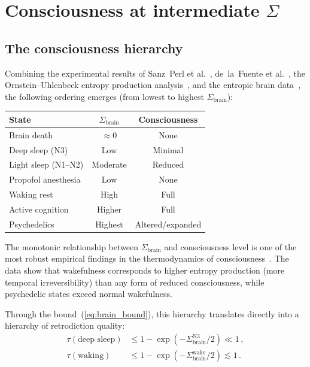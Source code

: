 \documentclass[prl,twocolumn,superscriptaddress,longbibliography,floatfix]{revtex4-2}
\newcommand{\tauasym}{\tau}
\newcommand{\Sbrain}{\Sigma_{\mathrm{brain}}}
\begin{document}
\section{Consciousness at intermediate $\Sigma$}
\label{sec:intermediate}

\subsection{The consciousness hierarchy}
\label{subsec:hierarchy}

Combining the experimental results of Sanz~Perl et
al.~\cite{SanzPerl2021}, de~la~Fuente et al.~\cite{delaFuente2022},
the Ornstein--Uhlenbeck entropy production
analysis~\cite{Lynn2023}, and the entropic brain
data~\cite{CarhartHarris2014,Schartner2017}, the following ordering
emerges (from lowest to highest $\Sbrain$):

\medskip
\noindent
\begin{center}
\begin{tabular}{lcc}
\toprule
\textbf{State} & \textbf{$\Sbrain$} & \textbf{Consciousness} \\
\midrule
Brain death & $\approx 0$ & None \\
Deep sleep (N3) & Low & Minimal \\
Light sleep (N1--N2) & Moderate & Reduced \\
Propofol anesthesia & Low & None \\
Waking rest & High & Full \\
Active cognition & Higher & Full \\
Psychedelics & Highest & Altered/expanded \\
\bottomrule
\end{tabular}
\end{center}
\medskip

The monotonic relationship between $\Sbrain$ and consciousness level
is one of the most robust empirical findings in the thermodynamics of
consciousness~\cite{SanzPerl2021,delaFuente2022,PRR2025}.  The data
show that wakefulness corresponds to higher entropy production (more
temporal irreversibility) than any form of reduced consciousness,
while psychedelic states exceed normal wakefulness.

Through the bound~(\ref{eq:brain_bound}), this hierarchy translates
directly into a hierarchy of retrodiction quality:
\begin{align}
\tauasym(\text{deep sleep}) &\leq
  1-\exp(-\Sbrain^{\mathrm{N3}}/2) \ll 1\,,
\label{eq:hier1}\\
\tauasym(\text{waking}) &\leq
  1-\exp(-\Sbrain^{\mathrm{wake}}/2) \lesssim 1\,.
\label{eq:hier2}
\end{align}
\end{document}
